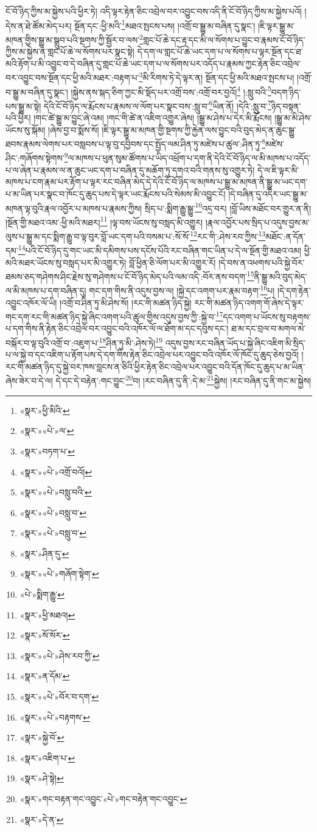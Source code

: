 ངོ་བོ་ཉིད་ཀྱིས་མ་སྐྱེས་པའི་ཕྱིར་ཏེ། འདི་ལྟར་རྟེན་ཅིང་འབྲེལ་བར་འབྱུང་བས་འདི་ནི་ངོ་བོ་ཉིད་ཀྱིས་མ་སྐྱེས་པའོ། །དེས་ན་ཐེ་ཚོམ་མེད་པར། སྔོན་དང་:ཕྱི་མའི་\footnote{«སྣར་»ཕྱི་མིའི་}མཐའ་སྤངས་པས། །འགྲོ་བ་སྒྱུ་མ་བཞིན་དུ་སྣང་། །ཇི་ལྟར་སྒྱུ་མ་མཁན་གྱིས་སྒྱུ་མ་སྒྲུབ་པའི་སྔགས་ཀྱི་སྦྱོར་བ་ལས་\footnote{«སྣར་»«པེ་»ལ་}གླང་པོ་ཆེ་དང་རྟ་དང་མི་ལ་སོགས་པ་བྱུང་བ་རྣམས་ངོ་བོ་ཉིད་ཀྱིས་མ་སྐྱེས་ན་གླང་པོ་ཆེ་ལ་སོགས་པར་སྣང་སྟེ། དེ་དག་ལ་གླང་པོ་ཆེ་ཡང་དག་པ་ལ་སོགས་པ་ལྟར་སྔོན་དང་ཐ་མའི་རྟོག་པ་མི་འབྱུང་བ་དེ་བཞིན་དུ་གླང་པོ་ཆེ་ཡང་དག་པ་ལ་སོགས་པར་འདོད་པ་རྣམས་ཀྱང་རྟེན་ཅིང་འབྲེལ་བར་འབྱུང་བས་སྔོན་དང་ཕྱི་མའི་མཐར་:བརྟག་པ་\footnote{«སྣར་»བཏག་པ་}མི་རིགས་ཏེ་དེ་ལྟར་ན། སྔོན་དང་ཕྱི་མའི་མཐའ་སྤངས་པ། །འགྲོ་བ་སྒྱུ་མ་བཞིན་དུ་སྣང་། །སྐྱེས་ནས་སྐད་ཅིག་ཀྱང་མི་སྡོད་པར་འགྲོ་བས་:འགྲོ་བར་བྱའོ།\footnote{«སྣར་»«པེ་»འགྲོ་བའོ།} །:སླུ་བའི་\footnote{«སྣར་»«པེ་»བསླུ་བའི་}བདག་ཉིད་པས་སྒྱུ་མ་སྟེ། དེའི་ངོ་བོ་ཉིད་ལ་རྨོངས་པ་རྣམས་ལ་ལོག་པར་སྣང་བས་:སླུ་བ་\footnote{«སྣར་»«པེ་»བསླུ་བ་}ཡིན་ནོ། །དེའི་:སླུ་བ་\footnote{«སྣར་»«པེ་»བསླུ་བ་}ཉིད་བསྟན་པའི་ཕྱིར། །གང་ཚེ་སྒྱུ་མ་བྱུང་ཞེ་འམ། །གང་གི་ཚེ་ན་འཇིག་འགྱུར་ཞེས། །སྒྱུ་མ་ཤེས་པ་དེར་མི་རྨོངས། །སྒྱུ་མ་མི་ཤེས་ཡོངས་སུ་སྐོམ། །ཞེས་བྱ་བ་སྨོས་སོ། །ཇི་ལྟར་སྒྱུ་མ་མཁན་གྱི་སྔགས་ཀྱི་རྐྱེན་ལས་བྱུང་བའི་བུད་མེད་ན་ཆུང་སྒྱུ་ཐབས་རྣམས་ལེགས་པར་བསླབས་པ་ལྟ་བུ་དབྱིབས་དང་སྤྱོད་ལམ་ཤིན་ཏུ་མཛེས་པ་ཚུལ་:ཤིན་ཏུ་\footnote{«སྣར་»ཤིན་དུ་}མཛེས་ཤིང་:གཞོགས་སྟེགས་\footnote{«སྣར་»«པེ་»གཞོག་སྟེག་}ལ་མཁས་པ་ཕུན་སུམ་ཚོགས་པ་ཡིད་འཕྲོག་པ་དག་ནི་དེའི་ངོ་བོ་ཉིད་ལ་མི་མཁས་པ་འདོད་པ་ལ་ཞེན་པ་རྣམས་ལ་ན་ཆུང་ཡང་དག་པ་བཞིན་དུ་མཆོག་ཏུ་དགའ་བའི་གནས་སུ་འགྱུར་ཏེ། དེ་ལ་ཇི་ལྟར་མི་མཁས་པ་ངག་རྣམ་པར་རྟོག་པ་ལྟར་རང་བཞིན་མེད་དེ་དེའི་ངོ་བོ་ཉིད་ལ་མཁས་པ་སྒྱུ་མ་མཁན་ནི་སྒྱུ་མ་ཡང་དག་པ་མ་ཡིན་པར་སྣང་བ་ཁོང་དུ་ཆུད་པས་དེ་ལྟར་ཡང་རྨོངས་པའི་སེམས་མི་འབྱུང་ངོ། །དེ་བཞིན་དུ་འདིར་ཡང་སྒྱུ་མ་མཁན་ལྟ་བུའི་རྣལ་འབྱོར་པ་མཁས་པ་རྣམས་ཀྱིས། སྲིད་པ་:སྨིག་རྒྱུ་སྒྱུ་\footnote{«པེ་»སྨིག་རྒྱུ་}འདྲ་བར། །བློ་ཡིས་མཐོང་བར་གྱུར་ན་ནི། །སྔོན་གྱི་མཐའ་འམ་:ཕྱི་མའི་མཐར།\footnote{«སྣར་»ཕྱི་མཐའ།} །ལྟ་བས་ཡོངས་སུ་བསླད་མི་འགྱུར། །རྣལ་འབྱོར་པས་སྲིད་པ་འདུས་བྱས་མ་ལུས་པ་སྒྱུ་མ་དང་སྨིག་རྒྱུ་བ་ལྟ་བུར་བློ་ཡང་དག་པའི་བསམ་པ་:སོ་སོ་\footnote{«སྣར་»སོ་སོར་}རང་གི་:ཤེས་རབ་ཀྱིས་\footnote{«སྣར་»«པེ་»ཤེས་རབ་ཀྱི་}མཐོང་:ན་དོན་དམ་\footnote{«སྣར་»ན་དོམ་}པའི་ངོ་བོ་ཉིད་དུ་གང་ཡང་མི་དམིགས་པས་དངོས་པོའི་རང་བཞིན་གང་ཡིན་པ་དེ་ལ་སྔོན་གྱི་མཐའ་འམ། ཕྱི་མའི་མཐར་ཡོངས་སུ་བསླད་པར་མི་འགྱུར་ཏེ། བློ་ཕྱིན་ཅི་ལོག་པར་མི་འགྱུར་རོ། །དེ་བས་ན་འཕགས་པའི་སྐྱེ་བོར་ཐམས་ཅད་གཤེགས་ཤིང་རྗེས་སུ་གཤེགས་པ་ངོ་བོ་ཉིད་མེད་པའི་ལམ་འདི་:བོར་ནས་བདག་\footnote{«སྣར་»«པེ་»བོར་བ་དག་}ནི་སྒྱུ་མའི་བུད་མེད་ལ་མི་མཁས་པ་དག་བཞིན་དུ། གང་དག་གིས་ནི་འདུས་བྱས་ལ། །སྐྱེ་དང་འགག་པར་རྣམ་བརྟག་\footnote{«སྣར་»«པེ་»བརྟགས་}པ། །དེ་དག་རྟེན་འབྱུང་འཁོར་ལོ་ཡི། །འགྲོ་བ་ཤིན་ཏུ་མི་ཤེས་སོ། །རང་གི་མཚན་ཉིད་སྐྱེ། རང་གི་མཚན་ཉིད་འགག་གོ་ཞེས་དེ་ལྟར་གང་དག་རང་གི་མཚན་ཉིད་སྐྱེ་ཞིང་འགག་པའི་ཚུལ་གྱིས་འདུས་བྱས་ཀྱི་:སྐྱེ་བ་\footnote{«སྣར་»སྐྱེ་བོ་}དང་འགག་པ་ཡོངས་སུ་བརྟགས་པ་དག་གིས་ནི་རྟེན་ཅིང་འབྲེལ་བར་འབྱུང་བའི་འཁོར་ལོ་ལ་ཐོག་མ་དང་དབུས་དང་། ཐ་མ་དང་བྲལ་བ་མགལ་མེ་བསྐོར་བ་ལྟ་བུའི་འགྲོ་བ་:འཇུག་པ་\footnote{«སྣར་»འཇིག་པ་}ཤིན་ཏུ་མི་:ཤེས་ཏེ།\footnote{«སྣར་»ཤེ་སྟེ།} འདུས་བྱས་རང་བཞིན་ཡོད་པ་སྐྱེ་ཞིང་འཇིག་མི་སྲིད་པ་ལ་སྐྱེ་བ་དང་འཇིག་པ་རྟོག་པས་དེ་དག་གིས་རྟེན་ཅིང་འབྲེལ་པར་འབྱུང་བའི་འཁོར་ལོ་ཁོང་དུ་ཆུད་ཅེས་བྱའོ། །རང་གི་མཚན་ཉིད་དུ་སྐྱེ་བར་ཁས་བླངས་ན་ཅིའི་ཕྱིར་རྟེན་ཅིང་འབྲེལ་པར་འབྱུང་བའི་དོན་ཁོང་དུ་ཆུད་པ་མ་ཡིན་ཞེས་ཟེར་བ་དེ་ལ། དེ་དང་དེ་བརྟེན་:གང་བྱུང་\footnote{«སྣར་»གང་བརྟན་གང་འབྱུང་«པེ་»གང་བརྟེན་གང་འབྱུང་}བ། །རང་བཞིན་དུ་ནི་:དེ་མ་\footnote{«སྣར་»དེ་ན་}སྐྱེས། །རང་བཞིན་དུ་ནི་གང་མ་སྐྱེས། 